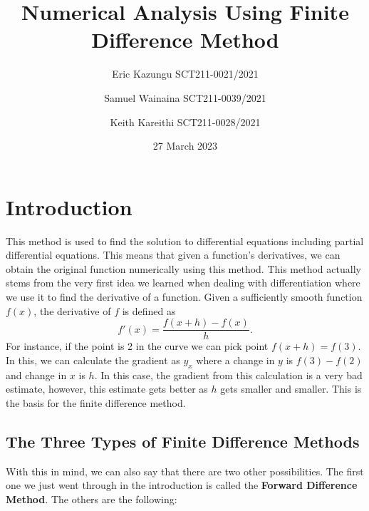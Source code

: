 \documentclass{article}
\title{Numerical Analysis Using Finite Difference Method}
\author{Eric Kazungu  SCT211-0021/2021 \and Samuel Wainaina  SCT211-0039/2021 \and Keith Kareithi  SCT211-0028/2021}
\date{27 March 2023}
\begin{document}
\maketitle
\section*{Introduction}
This method is used to find the solution to differential equations including partial differential equations. This means that given a function's derivatives, we can obtain the original function numerically using this method. This method actually stems from the very first idea we learned when dealing with differentiation where we use it to find the derivative of a function. Given a sufficiently smooth function $f(x)$, the derivative of $f$ is defined as
\begin{equation*}
    f'(x)=\frac{f(x+h)-f(x)}{h}.
\end{equation*}
For instance, if the point is 2 in the curve we can pick point $f(x+h)=f(3)$. In this, we can calculate the gradient as $y_x$ where a change in $y$ is $f(3)-f(2)$ and change in $x$ is $h$. In this case, the gradient from this calculation is a very bad estimate, however, this estimate gets better as $h$ gets smaller and smaller. This is the basis for the finite difference method.

\subsection*{The Three Types of Finite Difference Methods}

With this in mind, we can also say that there are two other possibilities. The first one we just went through in the introduction is called the \textbf{Forward Difference Method}. The others are the following:
\end{document}
